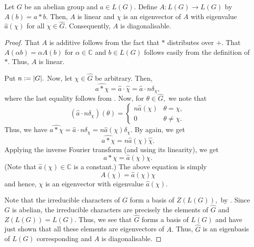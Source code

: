 \begin{lem} \label{lem:convolvediagonal}
    Let $G$ be an abelian group and $a \in L(G).$ Define $A : L(G) \to L(G)$ by $A(b) = a * b.$ Then, $A$ is linear and $\chi$ is an eigenvector of $A$ with eigenvalue $\widehat{a}(\chi)$ for all $\chi \in \widehat{G}.$ Consequently, $A$ is diagonalisable.
\end{lem}
\begin{proof} 
    That $A$ is additive follows from the fact that $*$ distributes over $+.$ That $A(\alpha b) = \alpha A(b)$ for $\alpha \in \mathbb{C}$ and $b \in L(G)$ follows easily from the definition of $*.$ Thus, $A$ is linear.

    Put $n \vcentcolon= {\left\lvert G \right\lvert}.$ Now, let $\chi \in \widehat{G}$ be arbitrary. Then,
    \begin{equation*} 
        \widehat{a * \chi} = \widehat{a} \cdot \widehat{\chi} = \widehat{a} \cdot n \delta_\chi,
    \end{equation*}
    where the last equality follows from . Now, for $\theta \in \widehat{G},$ we note that
    \begin{equation*} 
        (\widehat{a} \cdot n \delta_\chi)(\theta) = \begin{cases}
            n\widehat{a}(\chi) & \theta = \chi,\\
            0 & \theta \neq \chi.   
        \end{cases}
    \end{equation*}
    Thus, we have $\widehat{a * \chi} = \widehat{a} \cdot n \delta_\chi = n \widehat{a}(\chi) \delta_\chi.$ By  again, we get
    \begin{equation*} 
        \widehat{a * \chi} = n \widehat{a}(\chi) \widehat{\chi}.
    \end{equation*}
    Applying the inverse Fourier transform (and using its linearity), we get
    \begin{equation*} 
        a * \chi = \widehat{a}(\chi) \chi.
    \end{equation*}
    (Note that $\widehat{a}(\chi) \in \mathbb{C}$ is a constant.) The above equation is simply
    \begin{equation*} 
        A(\chi) = \widehat{a}(\chi)\chi
    \end{equation*}
    and hence, $\chi$ is an eigenvector with eigenvalue $\widehat{a}(\chi).$

    Note that the irreducible characters of $G$ form a basis of $Z(L(G)),$ by . Since $G$ is abelian, the irreducible characters are precisely the elements of $\widehat{G}$ and $Z(L(G)) = L(G).$ Thus, we see that $\widehat{G}$ forms a basis of $L(G)$ and have just shown that all these elements are eigenvectors of $A.$ Thus, $\widehat{G}$ is an eigenbasis of $L(G)$ corresponding and $A$ is diagonalisable.
\end{proof}

